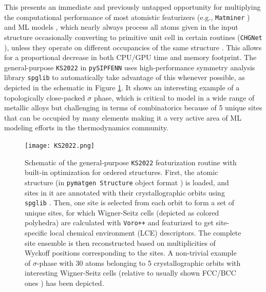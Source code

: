 This presents an immediate and previously untapped opportunity for multiplying the computational performance of most atomistic featurizers (e.g., \texttt{Matminer} \cite{Ward2018Matminer:Mining}) and ML models \cite{Ward2017, Chen2019GraphCrystals, Jha2019IRNet, Krajewski2022ExtensibleNetworks, Choudhary2021AtomisticPredictions, Deng2023CHGNetModelling, Davariashtiyani2023FormationRepresentation, Schmidt2023Machine-Learning-AssistedMaterials, Banik2024EvaluatingMaterials, Hu2021Atomtransmachine:Learning}, which nearly always process all atoms given in the input structure occasionally converting to primitive unit cell in certain routines (\texttt{CHGNet} \cite{Deng2023CHGNetModelling}), unless they operate on different occupancies of the same structure \cite{Crivello2022SupervisedExample}. This allows for a proportional decrease in both CPU/GPU time and memory footprint. The general-purpose \texttt{KS2022} in \texttt{pySIPFENN} uses high-performance symmetry analysis library \texttt{spglib} \cite{Togo2018Spglib:Search} to automatically take advantage of this whenever possible, as depicted in the schematic in Figure \ref{fig:ks2022}. It shows an interesting example of a topologically close-packed $\sigma$ phase, which is critical to model in a wide range of metallic alloys \cite{Joubert2008CrystalPhase} but challenging in terms of combinatorics because of 5 unique sites that can be occupied by many elements \cite{Choi2019ADesign, Ostrowska2020ThermodynamicW} making it a very active area of ML modeling efforts \cite{Crivello2022SupervisedExample, Zha2024ApplyingEnergy} in the thermodynamics community.

\begin{figure}[h]
    \centering
    \texttt{[image: KS2022.png]}
    \caption{
    Schematic of the general-purpose \texttt{KS2022} featurization routine with built-in optimization for ordered structures. First, the atomic structure (in \texttt{pymatgen Structure} object format \cite{Ong2013PythonAnalysis}) is loaded, and sites in it are annotated with their crystallographic orbits using \texttt{spglib} \cite{Togo2018Spglib:Search}. Then, one site is selected from each orbit to form a set of unique sites, for which Wigner-Seitz cells (depicted as colored polyhedra) are calculated with \texttt{Voro++} \cite{Rycroft2007MultiscaleFlow, Rycroft2009Voro++:C++, Lu2023AnCells} and featurized to get site-specific local chemical environment (LCE) descriptors. The complete site ensemble is then reconstructed based on multiplicities of Wyckoff positions corresponding to the sites. A non-trivial example of $\sigma$-phase with 30 atoms belonging to 5 crystallographic orbits with interesting Wigner-Seitz cells (relative to usually shown FCC/BCC ones \cite{Bohm1996VoronoiLattices}) has been depicted.
    }
    \label{fig:ks2022}
\end{figure}

